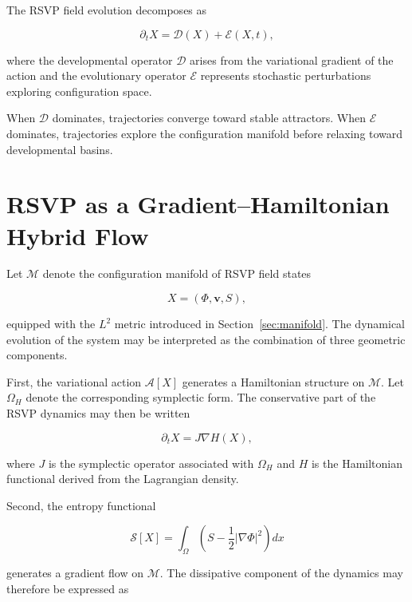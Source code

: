 \documentclass[12pt]{article}
\begin{document}
The RSVP field evolution decomposes as

\begin{equation}
\partial_t X =
\mathcal{D}(X) + \mathcal{E}(X,t),
\end{equation}

where the developmental operator $\mathcal{D}$ arises from the variational gradient of the action and the evolutionary operator $\mathcal{E}$ represents stochastic perturbations exploring configuration space.

When $\mathcal{D}$ dominates, trajectories converge toward stable attractors. When $\mathcal{E}$ dominates, trajectories explore the configuration manifold before relaxing toward developmental basins.

\section{RSVP as a Gradient--Hamiltonian Hybrid Flow}
\label{sec:hybridflow}

Let $\mathcal{M}$ denote the configuration manifold of RSVP field states

\begin{equation}
X = (\Phi,\mathbf{v},S),
\end{equation}

equipped with the $L^2$ metric introduced in Section~\ref{sec:manifold}.  
The dynamical evolution of the system may be interpreted as the combination of three geometric components.

First, the variational action $\mathcal{A}[X]$ generates a Hamiltonian structure on $\mathcal{M}$.  
Let $\Omega_H$ denote the corresponding symplectic form.  
The conservative part of the RSVP dynamics may then be written

\begin{equation}
\partial_t X = J \nabla H(X),
\end{equation}

where $J$ is the symplectic operator associated with $\Omega_H$ and $H$ is the Hamiltonian functional derived from the Lagrangian density.

Second, the entropy functional

\begin{equation}
\mathcal{S}[X] =
\int_{\Omega}
\left(
S - \frac{1}{2}|\nabla \Phi|^2
\right) dx
\end{equation}

generates a gradient flow on $\mathcal{M}$.  
The dissipative component of the dynamics may therefore be expressed as
\end{document}
